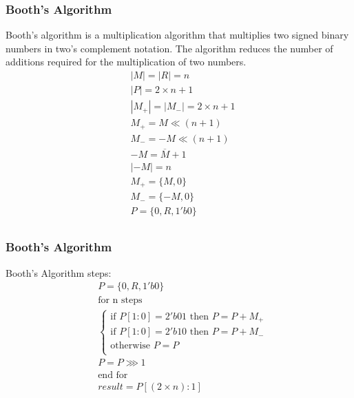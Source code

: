 \begin{frame}
    \frametitle{Booth's Algorithm}
 Booth's algorithm is a multiplication algorithm that multiplies two signed binary numbers in two's complement notation.
 The algorithm reduces the number of additions required for the multiplication of two numbers.
    \begin{equation}
        \begin{aligned}
            &|M|=|R|=n\\
            &|P|=2 \times n + 1\\
            &|M_{+}|=|M_{-}|=2 \times n+1\\
            &M_{+}=M \ll (n + 1)\\
            &M_{-}=-M \ll (n + 1)\\
            &-M=\overline{M}+1\\
            &|-M|=n\\
            &M_{+}=\{M, 0\}\\
            &M_{-}=\{-M, 0\}\\
            &P=\{0,R,1'b0\}\\
        \end{aligned}
    \end{equation}
\end{frame}

\begin{frame}
    \frametitle{Booth's Algorithm}
 Booth's Algorithm steps:
    \begin{equation}
        \begin{aligned}
            &P=\{0,R,1'b0\}\\
            &\text{for n steps}\\
            &\begin{cases}
 \text{if } P[1:0]=2'b01 \text{ then } P=P+M_{+}\\
 \text{if } P[1:0]=2'b10 \text{ then } P=P+M_{-}\\
 \text{otherwise } P=P\\
            \end{cases}\\
            &P=P \ggg 1\\
            &\text{end for}\\
            &result=P[(2 \times n):1]
        \end{aligned}
    \end{equation}
\end{frame}



